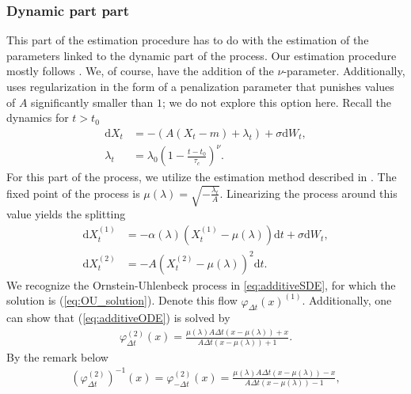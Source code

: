 \subsubsection{Dynamic part part}\label{subsubsec:OUprocessDynamic}
This part of the estimation procedure has to do with the estimation of the parameters linked to the dynamic part of the process. Our estimation procedure mostly follows \cite{Ditlevsen2023}. We, of course, have the addition of the $\nu$-parameter. Additionally, \cite{Ditlevsen2023} uses regularization in the form of a penalization parameter that punishes values of $A$ significantly smaller than $1$; we do not explore this option here. Recall the dynamics for $t>t_0$
\begin{align}
    \mathrm{d}X_t &= -\left(A\left(X_t - m\right) + \lambda_t\right) + \sigma \mathrm{d}W_t \label{eq:additiveDynamicPart},\\
    \lambda_t &= \lambda_0\left(1 - \frac{t - t_0}{\tau_c}\right)^\nu.
\end{align}
For this part of the process, we utilize the estimation method described in \cite{DitlevsenSupplementary}. The fixed point of the process is $\mu\left(\lambda\right) = \sqrt{-\frac{\lambda_t}{A}}$. Linearizing the process around this value yields the splitting
\begin{align}
    \mathrm{d}X_t^{(1)} &= -\alpha\left(\lambda\right)\left(X_t^{(1)} - \mu\left(\lambda\right)\right)\mathrm{d}t + \sigma \mathrm{d}W_t, \label{eq:additiveSDE}\\
    \mathrm{d}X_t^{(2)} &= -A \left(X_t^{(2)} - \mu\left(\lambda\right)\right)^2\mathrm{d}t. \label{eq:additiveODE}
\end{align}
We recognize the Ornstein-Uhlenbeck process in \ref{eq:additiveSDE}, for which the solution is (\ref{eq:OU_solution}). Denote this flow $\varphi_{\Delta t}(x)^{(1)}$. Additionally, one can show that (\ref{eq:additiveODE}) is solved by 
\begin{align}
    \varphi^{(2)}_{\Delta t}(x) = \frac{\mu\left(\lambda\right)A\Delta t\left(x - \mu\left(\lambda\right)\right) + x}{A\Delta t\left(x- \mu\left(\lambda\right)\right) + 1}.
\end{align}
By the remark below \cite[equation 9]{SplittingSchemes} 
\begin{align}
    \left(\varphi^{(2)}_{\Delta t}\right)^{-1}(x) = \varphi^{(2)}_{-\Delta t}(x) = \frac{\mu\left(\lambda\right)A\Delta t\left(x - \mu\left(\lambda\right)\right) - x}{A\Delta t\left(x- \mu\left(\lambda\right)\right) - 1},
\end{align}
